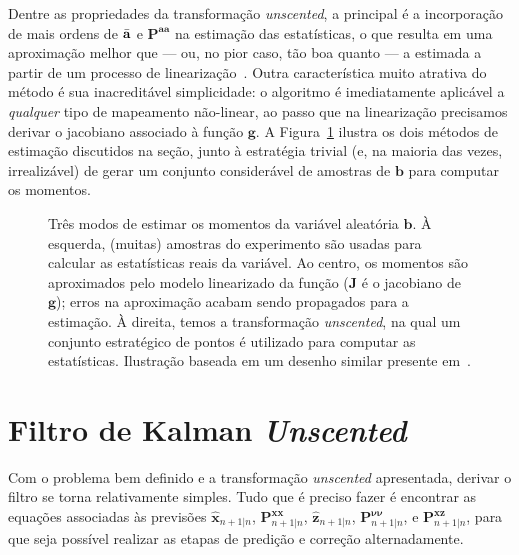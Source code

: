 Dentre as propriedades da transformação \textit{unscented}, a principal é a incorporação de mais ordens de $\Bar{\mathbf{a}}$ e $\mathbf{P}^{\mathbf{a}\mathbf{a}}$ na estimação das estatísticas, o que resulta em uma aproximação melhor que --- ou, no pior caso, tão boa quanto --- a estimada a partir de um processo de linearização~\cite{julier-1997}. Outra característica muito atrativa do método é sua inacreditável simplicidade: o algoritmo é imediatamente aplicável a \emph{qualquer} tipo de mapeamento não-linear, ao passo que na linearização precisamos derivar o jacobiano associado à função $\mathbf{g}$. A Figura~\ref{fig:unscented:ut} ilustra os dois métodos de estimação discutidos na seção, junto à estratégia trivial (e, na maioria das vezes, irrealizável) de gerar um conjunto considerável de amostras de $\mathbf{b}$ para computar os momentos.

\begin{figure}[!ht]
    \centering
    
    \caption[Ilustração dos métodos de estimação de momentos]{Três modos de estimar os momentos da variável aleatória $\mathbf{b}$. À esquerda, (muitas) amostras do experimento são usadas para calcular as estatísticas reais da variável. Ao centro, os momentos são aproximados pelo modelo linearizado da função ($\mathbf{J}$ é o jacobiano de $\mathbf{g}$); erros na aproximação acabam sendo propagados para a estimação. À direita, temos a transformação \textit{unscented}, na qual um conjunto estratégico de pontos é utilizado para computar as estatísticas. Ilustração baseada em um desenho similar presente em~\cite{wan-2000}.}
    \label{fig:unscented:ut}
\end{figure}

\section{Filtro de Kalman \textit{Unscented}}

Com o problema bem definido e a transformação \textit{unscented} apresentada, derivar o filtro se torna relativamente simples. Tudo que é preciso fazer é encontrar as equações associadas às previsões $\hat{\mathbf{x}}_{n+1|n}$, $\mathbf{P}_{n+1|n}^{\mathbf{x}\mathbf{x}}$, $\hat{\mathbf{z}}_{n+1|n}$, $\mathbf{P}_{n+1|n}^{\bm{\nu}\bm{\nu}}$, e $\mathbf{P}_{n+1|n}^{\mathbf{x}\mathbf{z}}$, para que seja possível realizar as etapas de predição e correção alternadamente.

